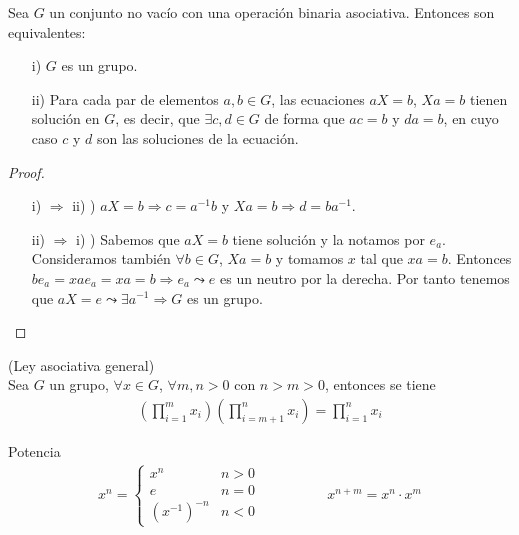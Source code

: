 \begin{lema}
    Sea $G$ un conjunto no vacío con una operación binaria asociativa. Entonces son equivalentes:
    \begin{enumerate}
        \item[i)] $G$ es un grupo.
        \item[ii)] Para cada par de elementos $a,b\in G$, las ecuaciones $aX=b$, $Xa=b$ tienen solución en $G$, es decir, que $\exists c,d\in G$ de forma que $ac=b$ y $da=b$, en cuyo caso $c$ y $d$ son las soluciones de la ecuación. 
    \end{enumerate}
    \begin{proof}\
        \begin{itemize}
            \item[i) $\Rightarrow$ ii) )] $aX=b \Rightarrow c=a^{-1}b$ y $Xa=b\Rightarrow d=ba^{-1}$.
            \item[ii) $\Rightarrow$ i) )] Sabemos que $aX=b$ tiene solución y la notamos por $e_a$. Consideramos también $\forall b\in G$, $Xa=b$ y tomamos $x$ tal que $xa=b$. Entonces $be_a = xae_a = xa = b \Rightarrow e_a \leadsto e$ es un neutro por la derecha. Por tanto tenemos que $aX=e \leadsto \exists a^{-1} \Rightarrow G$ es un grupo. 
        \end{itemize}
    \end{proof}
\end{lema} 

\begin{lema}
    (Ley asociativa general)\\
    Sea $G$ un grupo, $\forall x \in G$, $\forall m,n>0$ con $n>m>0$, entonces se tiene
    \begin{align*}
        \left(\prod\limits_{i=1}^m x_i\right)\left(\prod\limits_{i=m+1}^n x_i\right) = \prod\limits_{i=1}^n x_i
    \end{align*}

\end{lema}

\begin{definicion}
    Potencia
    \begin{align*}
        x^n = \left\{
        \begin{array}{ll}
            x^n & n>0\\
            e & n=0\\
            (x^{-1})^{-n} & n<0
        \end{array}
        \right.\hspace{2cm} x^{n+m}=x^n \cdot x^m
    \end{align*}
\end{definicion}

